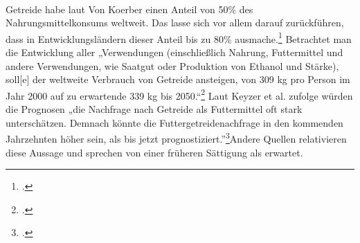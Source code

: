 \documentclass{scrartcl}
\begin{document}

%

\\Getreide habe laut Von Koerber einen Anteil von 50\% des Nahrungsmittelkonsums weltweit. Das lasse sich vor allem darauf zurückführen, dass in Entwicklungsländern dieser Anteil bis zu 80\% ausmache.\footcite[Vgl.][S.4ff]{VonKoerber2008Globale-trends}
Betrachtet man die Entwicklung aller „Verwendungen (einschließlich Nahrung, Futtermittel und andere Verwendungen, wie Saatgut oder Produktion von Ethanol und Stärke), soll[e] der weltweite Verbrauch von Getreide ansteigen, von 309 kg pro Person im Jahr 2000 auf zu erwartende 339 kg bis 2050.“\footcites[S.3ff]{VonKoerber2008Globale-trends}[vgl.][S.23ff]{FAO2006World2030/2050} 
Laut Keyzer et al. zufolge würden die Prognosen „die Nachfrage nach Getreide als Futtermittel oft stark unterschätzen. Demnach könnte die Futtergetreidenachfrage in den kommenden Jahrzehnten höher sein, als bis jetzt prognostiziert.”\footcite[S.3f]{VonKoerber2008Globale-trends}Andere Quellen relativieren diese Aussage und sprechen von einer früheren Sättigung als erwartet.\\
\end{document}
